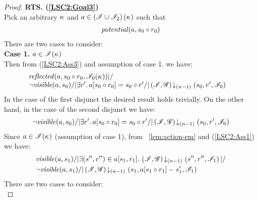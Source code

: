 \begin{lemma}
\begin{proof}
\noindent\textbf{RTS. (\ref{LSC2:Goal3})} \\
Pick an arbitrary $\kappa_{}$ and $a \in \left(\mathscr{I} \cup \mathscr{I}_2 \right)(\kappa_{})$ such that
%
\begin{align}
	\mathit{potential}(a, s_0 \circ r_0) \label{LSC2:Ass16}
\end{align}
There are two cases to consider:\\

\noindent\textbf{Case 1. } $a \in \mathscr{I}(\kappa_{})$\\
Then from (\ref{LSC2:Ass3}) and assumption of case 1. we have:
%
\begin{align*}
&\begin{array}{l}
	\mathit{reflected}(a, s_0 \circ r_0, \mathscr{I}_0(\kappa_{})) |/ \\
	\neg\mathit{visible}(a, s_0) /| \exists r'.\, a[s_0 \circ r_0] = s_0 \circ r' /| \left(\mathscr{I}, \mathscr{G}\right) \!\downarrow_{(n-1)} \left(s_0, r', \mathscr{I}_0\right)
\end{array}
\end{align*}
%
In the case of the first disjunct the desired result holds trivially. On the other hand, in the case of the second disjunct we have:
%
\begin{align}
	\neg\mathit{visible}(a, s_0) /| \exists r'.\, a[s_0 \circ r_0] = s_0 \circ r' /| \left(\mathscr{I}, \mathscr{G}\right) \!\downarrow_{(n-1)} \left(s_0, r', \mathscr{I}_0\right) \label{LSC2:Ass17}
\end{align}
%
Since $a \in \mathscr{I}(\kappa_{})$ (assumption of case 1), from \lem~\ref{lem:action-em} and (\ref{LSC2:Ass1}) we have: 
%
\begin{align*}
	&	\mathit{visible}(a, s_1) /| \exists (s'', r'') \in a[s_1, r_1].\, \left(\mathscr{I}, \mathscr{G}\right) \!\downarrow_{(n-1)} \left(s'', r'', \mathscr{I}_1\right) |/ \\
	& \neg\mathit{visible}(a, s_1) /| \left(\mathscr{I}, \mathscr{G}\right) \!\downarrow_{(n-1)} \left(s_1, a[s_1 \circ r_1] - s_1', \mathscr{I}_1\right)
\end{align*}
There are two cases to consider:\\


\end{proof}
\end{lemma}
